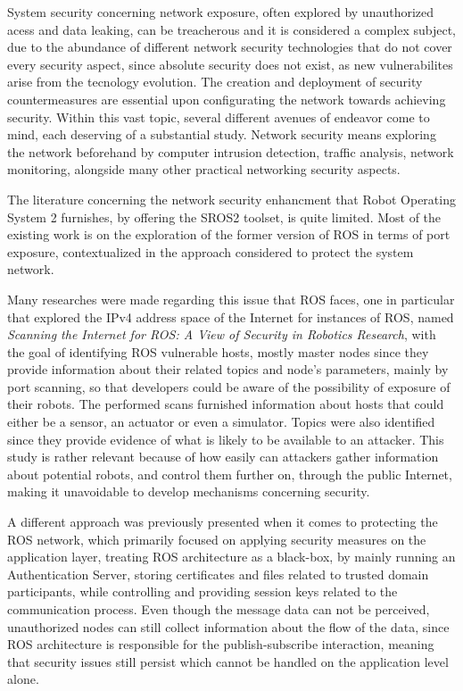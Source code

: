 System security concerning network exposure, often explored by unauthorized acess and data leaking, can be treacherous and it is considered a complex subject, due to the abundance of different network security technologies that do not cover every security aspect, since absolute security does not exist, as new vulnerabilites arise from the tecnology evolution.\cite{kaeo2004designing} The creation and deployment of security countermeasures are essential upon configurating the network towards achieving security. Within this vast topic, several different avenues of endeavor come to mind, each deserving of a substantial study. Network security means exploring the network beforehand by computer intrusion detection, traffic analysis, network monitoring, alongside many other practical networking security aspects.\cite{marin2005network}

The literature concerning the network security enhancment that Robot Operating System 2 furnishes, by offering the SROS2 toolset, is quite limited. Most of the existing work is on the exploration of the former version of ROS in terms of port exposure, contextualized in the approach considered to protect the system network.  

Many researches were made regarding this issue that ROS faces, one in particular that explored the IPv4 address space of the Internet for instances of ROS, named \textit{Scanning the Internet for ROS: A View of Security in Robotics Research}\cite{8794451}, with the goal of identifying ROS vulnerable hosts, mostly master nodes since they provide information about their related topics and node's parameters, mainly by port scanning, so that developers could be aware of the possibility of exposure of their robots. The performed scans furnished information about hosts that could either be a sensor, an actuator or even a simulator. Topics were also identified since they provide evidence of what is likely to be available to an attacker. This study is rather relevant because of how easily can attackers gather information about potential robots, and control them further on, through the public Internet, making it unavoidable to develop mechanisms concerning security.

A different approach was previously presented\cite{application-security-ros} when it comes to protecting the ROS network, which primarily focused on applying security measures on the application layer, treating ROS architecture as a black-box, by mainly running an Authentication Server, storing certificates and files related to trusted domain participants, while controlling and providing session keys related to the communication process. Even though the message data can not be perceived, unauthorized nodes can still collect information about the flow of the data, since ROS architecture is responsible for the publish-subscribe interaction, meaning that security issues still persist which cannot be handled on the application level alone.  

